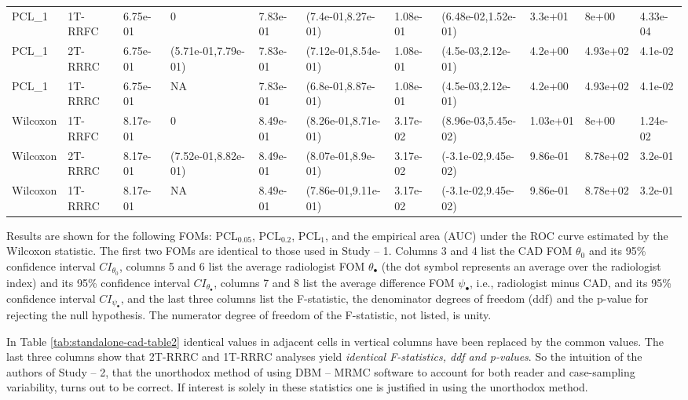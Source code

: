 \documentclass[
]{book}
\begin{document}
\begin{table}[H]
{\begin{tabular}[t]{lllllllllll}
PCL\_1 & 1T-RRFC & 6.75e-01 & 0 & 7.83e-01 & (7.4e-01,8.27e-01) & 1.08e-01 & (6.48e-02,1.52e-01) & 3.3e+01 & 8e+00 & 4.33e-04\\
PCL\_1 & 2T-RRRC & 6.75e-01 & (5.71e-01,7.79e-01) & 7.83e-01 & (7.12e-01,8.54e-01) & 1.08e-01 & (4.5e-03,2.12e-01) & 4.2e+00 & 4.93e+02 & 4.1e-02\\
PCL\_1 & 1T-RRRC & 6.75e-01 & NA & 7.83e-01 & (6.8e-01,8.87e-01) & 1.08e-01 & (4.5e-03,2.12e-01) & 4.2e+00 & 4.93e+02 & 4.1e-02\\
Wilcoxon & 1T-RRFC & 8.17e-01 & 0 & 8.49e-01 & (8.26e-01,8.71e-01) & 3.17e-02 & (8.96e-03,5.45e-02) & 1.03e+01 & 8e+00 & 1.24e-02\\
\addlinespace
Wilcoxon & 2T-RRRC & 8.17e-01 & (7.52e-01,8.82e-01) & 8.49e-01 & (8.07e-01,8.9e-01) & 3.17e-02 & (-3.1e-02,9.45e-02) & 9.86e-01 & 8.78e+02 & 3.2e-01\\
Wilcoxon & 1T-RRRC & 8.17e-01 & NA & 8.49e-01 & (7.86e-01,9.11e-01) & 3.17e-02 & (-3.1e-02,9.45e-02) & 9.86e-01 & 8.78e+02 & 3.2e-01\\
\bottomrule
\end{tabular}}
\end{table}

Results are shown for the following FOMs: \(\text{PCL}_{0.05}\), \(\text{PCL}_{0.2}\), \(\text{PCL}_{1}\), and the empirical area (AUC) under the ROC curve estimated by the Wilcoxon statistic. The first two FOMs are identical to those used in Study -- 1. Columns 3 and 4 list the CAD FOM \(\theta_0\) and its 95\% confidence interval \(CI_{\theta_0}\), columns 5 and 6 list the average radiologist FOM \(\theta_{\bullet}\) (the dot symbol represents an average over the radiologist index) and its 95\% confidence interval \(CI_{\theta_{\bullet}}\), columns 7 and 8 list the average difference FOM \(\psi_{\bullet}\), i.e., radiologist minus CAD, and its 95\% confidence interval \(CI_{\psi_{\bullet}}\), and the last three columns list the F-statistic, the denominator degrees of freedom (ddf) and the p-value for rejecting the null hypothesis. The numerator degree of freedom of the F-statistic, not listed, is unity.

In Table \ref{tab:standalone-cad-table2} identical values in adjacent cells in vertical columns have been replaced by the common values. The last three columns show that 2T-RRRC and 1T-RRRC analyses yield \emph{identical F-statistics, ddf and p-values}. So the intuition of the authors of Study -- 2, that the unorthodox method of using DBM -- MRMC software to account for both reader and case-sampling variability, turns out to be correct. If interest is solely in these statistics one is justified in using the unorthodox method.
\end{document}
